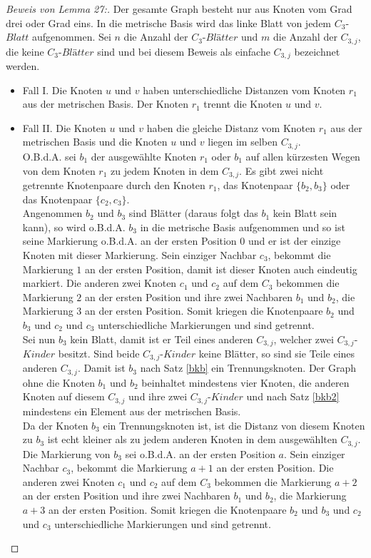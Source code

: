 \begin{proof}[Beweis von Lemma 27:]
Der gesamte Graph besteht nur aus Knoten vom Grad drei oder Grad eins. In die metrische Basis wird das linke Blatt von jedem $C_{3}$-$Blatt$ aufgenommen. Sei $n$ die Anzahl der $C_{3}$-$Blätter$ und $m$ die Anzahl der $C_{3,j}$, die keine $C_{3}$-$Blätter$ sind und bei diesem Beweis als einfache $C_{3,j}$ bezeichnet werden.\\
\begin{itemize}
\item Fall I. Die Knoten $u$ und $v$ haben unterschiedliche Distanzen vom Knoten $r_1$ aus der metrischen Basis. Der Knoten $r_1$ trennt die Knoten $u$ und $v$.
\item Fall II. Die Knoten $u$ und $v$ haben die gleiche Distanz vom Knoten $r_1$ aus der metrischen Basis und die Knoten $u$ und $v$ liegen im selben $C_{3,j}$.\\
O.B.d.A. sei $b_1$ der ausgewählte Knoten $r_1$ oder $b_1$ auf allen kürzesten Wegen von dem Knoten $r_1$ zu jedem Knoten in dem $C_{3,j}$. Es gibt zwei nicht getrennte Knotenpaare durch den Knoten $r_1$, das Knotenpaar $\{b_2,b_3\}$ oder das Knotenpaar $\{c_2,c_3\}$.\\
Angenommen $b_2$ und $b_3$ sind Blätter (daraus folgt das $b_1$ kein Blatt sein kann), so wird o.B.d.A. $b_3$ in die metrische Basis aufgenommen und so ist seine Markierung o.B.d.A. an der ersten Position $0$ und er ist der einzige Knoten mit dieser Markierung. Sein einziger Nachbar $c_3$, bekommt die Markierung $1$ an der ersten Position, damit ist dieser Knoten auch eindeutig markiert. Die anderen zwei Knoten $c_1$ und $c_2$ auf dem $C_3$ bekommen die Markierung $2$ an der ersten Position und ihre zwei Nachbaren $b_1$ und $b_2$, die Markierung $3$ an der ersten Position. Somit kriegen die Knotenpaare $b_2$ und $b_3$ und $c_2$ und $c_3$ unterschiedliche Markierungen und sind getrennt.\\ 	 
Sei nun $b_3$ kein Blatt, damit ist er Teil eines anderen $C_{3,j}$, welcher zwei $C_{3,j}$-$Kinder$ besitzt. Sind beide $C_{3,j}$-$Kinder$ keine Blätter, so sind sie Teile eines anderen $C_{3,j}$. Damit ist $b_3$ nach Satz \ref{bkb} ein Trennungsknoten. Der Graph ohne die Knoten $b_1$ und $b_2$ beinhaltet mindestens vier Knoten, die anderen Knoten auf diesem $C_{3,j}$ und ihre zwei $C_{3,j}$-$Kinder$ und nach Satz \ref{bkb2} mindestens ein Element aus der metrischen Basis.\\
Da der Knoten $b_3$ ein Trennungsknoten ist, ist die Distanz von diesem Knoten zu $b_3$ ist echt kleiner als zu jedem anderen Knoten in dem ausgewählten $C_{3,j}$. Die Markierung von $b_3$ sei o.B.d.A. an der ersten Position $a$. Sein einziger Nachbar $c_3$, bekommt die Markierung $a+1$ an der ersten Position. Die anderen zwei Knoten $c_1$ und $c_2$ auf dem $C_3$ bekommen die Markierung $a+2$ an der ersten Position und ihre zwei Nachbaren $b_1$ und $b_2$, die Markierung $a+3$ an der ersten Position. Somit kriegen die Knotenpaare $b_2$ und $b_3$ und $c_2$ und $c_3$ unterschiedliche Markierungen und sind getrennt.

\end{itemize}
\end{proof}
